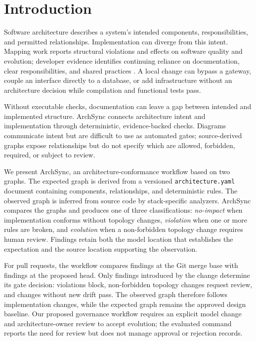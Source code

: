 \section{Introduction}

Software architecture describes a system's intended components, responsibilities, and permitted relationships. Implementation can diverge from this intent. Mapping work reports structural violations and effects on software quality and evolution; developer evidence identifies continuing reliance on documentation, clear responsibilities, and shared practices \cite{li2022erosion,anthony2024drifting}. A local change can bypass a gateway, couple an interface directly to a database, or add infrastructure without an architecture decision while compilation and functional tests pass.

Without executable checks, documentation can leave a gap between intended and implemented structure. ArchSync connects architecture intent and implementation through deterministic, evidence-backed checks. Diagrams communicate intent but are difficult to use as automated gates; source-derived graphs expose relationships but do not specify which are allowed, forbidden, required, or subject to review.

We present ArchSync, an architecture-conformance workflow based on two graphs. The expected graph is derived from a versioned \texttt{architecture.yaml} document containing components, relationships, and deterministic rules. The observed graph is inferred from source code by stack-specific analyzers. ArchSync compares the graphs and produces one of three classifications: \emph{no-impact} when implementation conforms without topology changes, \emph{violation} when one or more rules are broken, and \emph{evolution} when a non-forbidden topology change requires human review. Findings retain both the model location that establishes the expectation and the source location supporting the observation.

For pull requests, the workflow compares findings at the Git merge base with findings at the proposed head. Only findings introduced by the change determine its gate decision: violations block, non-forbidden topology changes request review, and changes without new drift pass. The observed graph therefore follows implementation changes, while the expected graph remains the approved design baseline. Our proposed governance workflow requires an explicit model change and architecture-owner review to accept evolution; the evaluated command reports the need for review but does not manage approval or rejection records.

